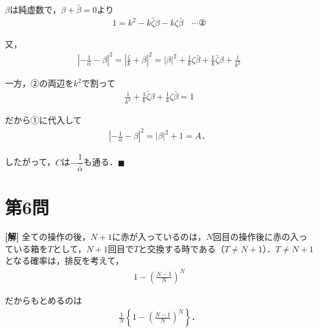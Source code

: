 \documentclass[../main.tex]{subfiles}
\begin{document}
$\beta$は純虚数で，$\beta+\bar\beta=0$より
\begin{align*}
  1=k^2-k\bar\zeta\beta-k\zeta\bar\beta\quad\cdots②
\end{align*}

又，
\begin{align*}
  \left|-\frac1{\bar\alpha}-\beta\right|^2=\left|\frac\zeta k+\beta\right|^2=|\beta|^2+\frac1k\zeta\bar\beta+\frac1k\bar\zeta\beta+\frac1{k^2}
\end{align*}

一方，②の両辺を$k^2$で割って
\begin{align*}
  \frac1{k^2}+\frac1k\bar\zeta\beta+\frac1k\zeta\bar\beta=1
\end{align*}

だから①に代入して
\begin{align*}
  \left|-\frac1{\bar\alpha}-\beta\right|^2=|\beta|^2+1=A．
\end{align*}

したがって，$C$は$-\dfrac1{\bar\alpha}$も通る．$\blacksquare$

\newpage

\section*{第6問}

{\bf [解]}
全ての操作の後，$N+1$に赤が入っているのは，$N$回目の操作後に赤の入っている箱を$T$として，$N+1$回目で$T$と交換する時である（$T\ne N+1$）．$T\ne N+1$となる確率は，排反を考えて，
\begin{align*}
  1-\left(\frac{N-1}N\right)^N
\end{align*}

だからもとめるのは
\begin{align*}
  \frac1N\left\{1-\left(\frac{N-1}N\right)^N\right\}．
\end{align*}

\newpage
\end{document}
